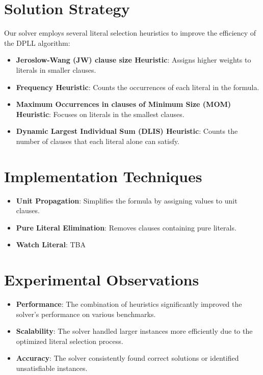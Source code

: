 \documentclass[titlepage]{article}
\begin{document}
\section*{Solution Strategy}
Our solver employs several literal selection heuristics to improve the efficiency of the DPLL algorithm:
\begin{itemize}
    \item \textbf{Jeroslow-Wang (JW) clause size Heuristic}: Assigns higher weights to literals in smaller clauses.
    \item \textbf{Frequency Heuristic}: Counts the occurrences of each literal in the formula.
    \item \textbf{Maximum Occurrences in clauses of Minimum Size (MOM) Heuristic}: Focuses on literals in the smallest clauses.
    \item \textbf{Dynamic Largest Individual Sum (DLIS) Heuristic}: Counts the number of clauses that each literal alone can satisfy.
\end{itemize}

\section*{Implementation Techniques}
\begin{itemize}
    \item \textbf{Unit Propagation}: Simplifies the formula by assigning values to unit clauses.
    \item \textbf{Pure Literal Elimination}: Removes clauses containing pure literals.
    \item \textbf{Watch Literal}: TBA
\end{itemize}

\section*{Experimental Observations}
\begin{itemize}
    \item \textbf{Performance}: The combination of heuristics significantly improved the solver's performance on various benchmarks.
    \item \textbf{Scalability}: The solver handled larger instances more efficiently due to the optimized literal selection process.
    \item \textbf{Accuracy}: The solver consistently found correct solutions or identified unsatisfiable instances.
\end{itemize}
\end{document}
